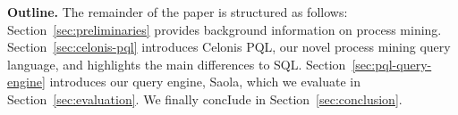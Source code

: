 \par\smallskip\noindent \textbf{Outline.} The remainder of the paper is
structured as follows: Section~\ref{sec:preliminaries} provides background
information on process mining. Section~\ref{sec:celonis-pql} introduces Celonis
PQL, our novel process mining query language, and highlights the main
differences to SQL. Section~\ref{sec:pql-query-engine} introduces our query
engine, Saola, which we evaluate in Section~\ref{sec:evaluation}. We finally
concIude in Section~\ref{sec:conclusion}.

